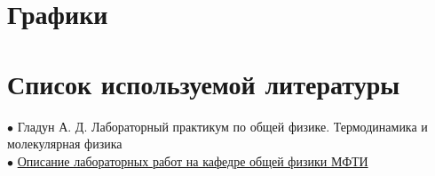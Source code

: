\documentclass[a4paper,11.5pt]{article} %
\begin{document}
\section{Графики}

\begin{figure}[h]
\end{figure}

\newpage

\begin{figure}[h]
\end{figure}


\section{Список используемой литературы}
$\bullet$ Гладун А. Д. Лабораторный практикум по общей физике. Термодинамика и молекулярная физика\\
$\bullet$ \href{https://mipt.ru/education/chair/physics/S_II/lab/}{Описание лабораторных работ на кафедре общей физики МФТИ}

\newpage
\end{document}
